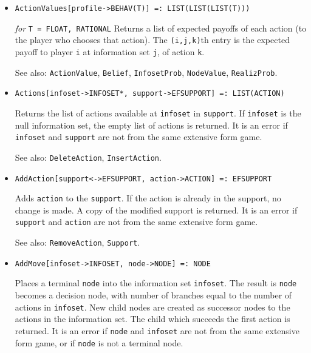 \begin{itemize}
\item{}
\protect \large \begin{verbatim}
ActionValues[profile->BEHAV(T)] =: LIST(LIST(LIST(T))) 
\end{verbatim}\normalsize

{\it for} {\tt T = FLOAT, RATIONAL}
\bd 
Returns a list of expected payoffs of each action (to the player who
chooses that action).  The \verb+(i,j,k)+th entry is the expected
payoff to player \verb+i+ at information set \verb+j+, of action \verb+k+. 

\item [See also:] \verb+ActionValue+, \verb+Belief+,
\verb+InfosetProb+, \verb+NodeValue+, \verb+RealizProb+.  
\ed

\item{}
\protect \large \begin{verbatim} 
Actions[infoset->INFOSET*, support->EFSUPPORT] =: LIST(ACTION)
\end{verbatim}\normalsize

\bd
Returns the list of actions available at \verb+infoset+ in
\verb+support+.  If \verb+infoset+ is the null information set, the
empty list of actions is returned.  It is an error if \verb+infoset+
and \verb+support+ are not from the same extensive form game.

\item [See also:] \verb+DeleteAction+, \verb+InsertAction+.
\ed

\item{}
\protect \large \begin{verbatim} 
AddAction[support<->EFSUPPORT, action->ACTION] =: EFSUPPORT
\end{verbatim}\normalsize

\bd 
Adds \verb+action+ to the \verb+support+.  If the action is already in
the support, no change is made.  A copy of the modified support is
returned.  It is an error if \verb+support+ and \verb+action+ are not from the
same extensive form game.

\item [See also:] \verb+RemoveAction+, \verb+Support+.
\ed

\item{}
\protect \large \begin{verbatim} 
AddMove[infoset->INFOSET, node->NODE] =: NODE
\end{verbatim}\normalsize

\bd
Places a terminal \verb+node+ into the information set
\verb+infoset+.  The result is \verb+node+ becomes a decision node,
with number of branches equal to the number of actions in \verb+infoset+.
New child nodes are created as successor nodes to the actions in the
information set.  The child which succeeds the first action is returned.
It is an error if \verb+node+ and \verb+infoset+ are not from the same
extensive form game, or if \verb+node+ is not a terminal node.


\end{itemize}
